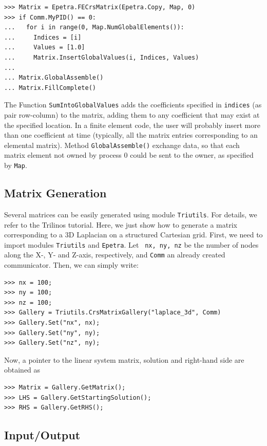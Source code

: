 \documentclass[10pt,relax]{SANDreport}
\begin{document}
\begin{verbatim}
>>> Matrix = Epetra.FECrsMatrix(Epetra.Copy, Map, 0)
>>> if Comm.MyPID() == 0:
...   for i in range(0, Map.NumGlobalElements()):
...     Indices = [i]
...     Values = [1.0]
...     Matrix.InsertGlobalValues(i, Indices, Values)
...
... Matrix.GlobalAssemble() 
... Matrix.FillComplete()
\end{verbatim}
The Function \verb!SumIntoGlobalValues! adds the coefficients specified
in \verb!indices! (as pair row-column) to the matrix, adding them to any
coefficient that may exist at the specified location. In a finite
element code, the user will probably insert more than one coefficient
at time (typically, all the matrix entries corresponding to an elemental
matrix). Method \verb!GlobalAssemble()! exchange data, so that 
each matrix element not owned by
process 0 could be sent to the owner, as specified by \verb!Map!. 

\subsection{Matrix Generation}
\label{sec:generation}

Several matrices can be easily generated using module {\tt Triutils}. For
details, we refer to the Trilinos tutorial. Here, we just show how to generate
a matrix corresponding to a 3D Laplacian on a structured Cartesian grid.
First, we need to import modules \verb!Triutils! and \verb!Epetra!. Let {\tt
  nx, ny, nz} be the number of nodes along the X-, Y- and Z-axis,
  respectively, and \verb!Comm! an already created communicator.
  Then, we can simply write:
\begin{verbatim}
>>> nx = 100;
>>> ny = 100;
>>> nz = 100;
>>> Gallery = Triutils.CrsMatrixGallery("laplace_3d", Comm)
>>> Gallery.Set("nx", nx);
>>> Gallery.Set("ny", ny);
>>> Gallery.Set("nz", ny);
\end{verbatim}
Now, a pointer to the linear system matrix, solution and right-hand side are
obtained as
\begin{verbatim}
>>> Matrix = Gallery.GetMatrix();
>>> LHS = Gallery.GetStartingSolution();
>>> RHS = Gallery.GetRHS();
\end{verbatim}

\subsection{Input/Output}
\label{sec:io}
\end{document}
